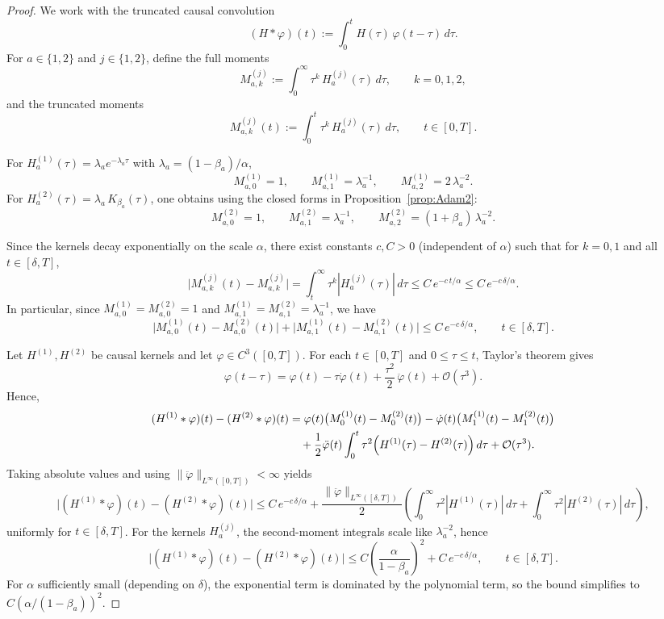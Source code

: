 \documentclass[10pt,a4paper]{amsart}
\begin{document}
\begin{proof}
We work with the truncated causal convolution
\[
(H*\varphi)(t):=\int_0^t H(\tau)\,\varphi(t-\tau)\,d\tau.
\]
For $a\in\{1,2\}$ and $j\in\{1,2\}$, define the full moments
\[
M^{(j)}_{a,k}:=\int_0^\infty \tau^k\,H^{(j)}_a(\tau)\,d\tau,\qquad k=0,1,2,
\]
and the truncated moments
\[
M^{(j)}_{a,k}(t):=\int_0^t \tau^k\,H^{(j)}_a(\tau)\,d\tau,\qquad t\in[0,T].
\]

For $H^{(1)}_a(\tau)=\lambda_a e^{-\lambda_a\tau}$ with $\lambda_a=(1-\beta_a)/\alpha$,
\[
M^{(1)}_{a,0}=1,\qquad
M^{(1)}_{a,1}=\lambda_a^{-1},\qquad
M^{(1)}_{a,2}=2\,\lambda_a^{-2}.
\]
For $H^{(2)}_a(\tau)=\lambda_a\,K_{\beta_a}(\tau)$, one obtains using the closed forms in Proposition~\ref{prop:Adam2}:
\[
M^{(2)}_{a,0}=1,\qquad
M^{(2)}_{a,1}=\lambda_a^{-1},\qquad
M^{(2)}_{a,2}=(1+\beta_a)\,\lambda_a^{-2}.
\]

Since the kernels decay exponentially on the scale $\alpha$, there exist constants $c,C>0$
(independent of $\alpha$) such that for $k=0,1$ and all $t\in[\delta,T]$,
\[
\bigl|M^{(j)}_{a,k}(t)-M^{(j)}_{a,k}\bigr|
=\int_t^\infty \tau^k |H^{(j)}_a(\tau)|\,d\tau
\le C\,e^{-c\,t/\alpha}
\le C\,e^{-c\,\delta/\alpha}.
\]
In particular, since $M^{(1)}_{a,0}=M^{(2)}_{a,0}=1$ and $M^{(1)}_{a,1}=M^{(2)}_{a,1}=\lambda_a^{-1}$,
we have
\[
\bigl|M^{(1)}_{a,0}(t)-M^{(2)}_{a,0}(t)\bigr|
+\bigl|M^{(1)}_{a,1}(t)-M^{(2)}_{a,1}(t)\bigr|
\le C\,e^{-c\,\delta/\alpha},
\qquad t\in[\delta,T].
\]

Let $H^{(1)},H^{(2)}$ be causal kernels and let $\varphi\in C^3([0,T])$.
For each $t\in[0,T]$ and $0\le \tau\le t$, Taylor's theorem gives
\[
\varphi(t-\tau)=\varphi(t)-\tau \dot\varphi(t)+\frac{\tau^2}{2}\,\ddot \varphi(t) + \mathcal{O}(\tau^3).
\]
Hence, 
\begin{align*}
(H^{(1)}*\varphi)(t)-(H^{(2)}*\varphi)(t)
&=\varphi(t)\bigl(M^{(1)}_0(t)-M^{(2)}_0(t)\bigr)
-\dot\varphi(t)\bigl(M^{(1)}_1(t)-M^{(2)}_1(t)\bigr)\\
&\quad+\frac12 \ddot\varphi(t)\int_0^t \tau^2\Bigl(H^{(1)}(\tau)-H^{(2)}(\tau)\Bigr)\,d\tau + \mathcal{O}(\tau^3).
\end{align*}
Taking absolute values and using $\|\ddot\varphi\|_{L^\infty([0,T])}<\infty$ yields
\[
\bigl|(H^{(1)}*\varphi)(t)-(H^{(2)}*\varphi)(t)\bigr|
\le C\,e^{-c\,\delta/\alpha}
+\frac{\|\ddot\varphi\|_{L^\infty([\delta,T])}}{2}
\left(\int_0^\infty \tau^2|H^{(1)}(\tau)|\,d\tau+\int_0^\infty \tau^2|H^{(2)}(\tau)|\,d\tau\right),
\]
uniformly for $t\in[\delta,T]$. For the kernels $H^{(j)}_a$, the second-moment integrals scale like $\lambda_a^{-2}$, hence
\[
\bigl|(H^{(1)}*\varphi)(t)-(H^{(2)}*\varphi)(t)\bigr|
\le C\left(\frac{\alpha}{1-\beta_a}\right)^2 + C\,e^{-c\,\delta/\alpha},
\qquad t\in[\delta,T].
\]
For $\alpha$ sufficiently small (depending on $\delta$), the exponential term is dominated by the
polynomial term, so the bound simplifies to $C(\alpha/(1-\beta_a))^2$.


\end{proof}
\end{document}

